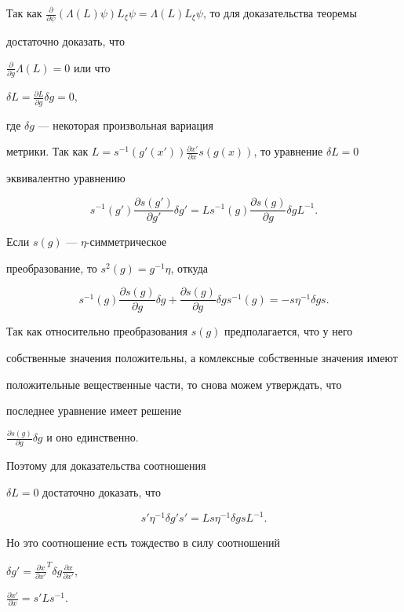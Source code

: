 \begin{pf}


Так как $\frac{\partial }{\partial \psi}(\Lambda(L)\psi)L_\xi\psi


=\Lambda(L)L_\xi\psi$, то для доказательства теоремы


достаточно доказать, что


$\frac{\partial }{\partial g}\Lambda(L)=0$ или что


$\delta L=\frac{\partial L}{\partial g}\delta g=0$,


где $\delta g$ --- некоторая произвольная вариация


метрики. Так как $L=s^{-1}(g'(x'))\frac{\partial x'}


{\partial x}s(g(x))$, то уравнение $\delta L=0$


эквивалентно уравнению


$$


s^{-1}(g') \frac{\partial s(g')}{\partial g'}\delta g'=


Ls^{-1}(g) \frac{\partial s(g)}{\partial g}\delta g L^{-1}.


$$


Если $s(g)$ --- $\eta$-симметрическое


преобразование, то $s^2(g)=g^{-1}\eta$, откуда


$$


s^{-1}(g) \frac{\partial s(g)}{\partial g}\delta g+


\frac{\partial s(g)}{\partial g}\delta gs^{-1}(g)=


-s\eta^{-1}\delta g s.


$$


Так как относительно преобразования $s(g)$ предполагается, что у него 


собственные значения положительны, а комлексные собственные значения имеют 


положительные вещественные части, то снова можем утверждать, что


последнее уравнение имеет решение


$\frac{\partial s(g)}{\partial g}\delta g$ и оно единственно.


Поэтому для доказательства соотношения


$\delta L=0$ достаточно доказать, что


$$


s'\eta^{-1}\delta g's'=Ls\eta^{-1}\delta gsL^{-1}.


$$


Но это соотношение есть тождество в силу соотношений


$\delta g'=\frac{\partial x}{\partial x'}^T\delta g


\frac{\partial x}{\partial x'}$,


$\frac{\partial x'}{\partial x}=s'Ls^{-1}$.


\end{pf}





